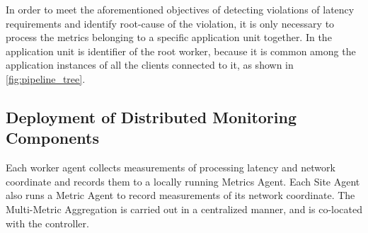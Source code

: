 In order to meet the aforementioned objectives of detecting violations of latency requirements and identify root-cause of the violation, it is only necessary to process the metrics belonging to a specific application unit together. In \oneedge{} the application unit is identifier of the root worker, because it is common among the application instances of all the clients connected to it, as shown in \cref{fig:pipeline_tree}.

\subsection{Deployment of Distributed Monitoring Components}
Each worker agent collects measurements of processing latency and network coordinate and records them to a locally running Metrics Agent. Each Site Agent also runs a Metric Agent to record measurements of its network coordinate. The Multi-Metric Aggregation is carried out in a centralized manner, and is co-located with the controller.

